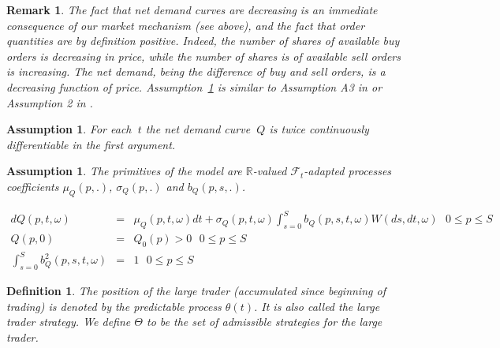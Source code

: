 \documentclass{article}
\newtheorem{definition}[theorem]{Definition}
\newtheorem{remark}[theorem]{Remark}
\newtheorem{assumption}[theorem]{Assumption}
\begin{document}

\begin{remark}
The fact that net demand curves are decreasing is an
immediate consequence of our market mechanism (see above), and the fact that
order quantities are by definition positive. Indeed, the number of shares of
available buy orders is decreasing in price, while the number of shares is
of available sell orders is increasing. The net demand, being the difference
of buy and sell orders, is a decreasing function of price. Assumption~\ref{ass::demand_twice_diff} is
similar to Assumption A3 in \cite{Jar92} or Assumption 2 in \cite{BB04}.
\end{remark}


\begin{assumption} \label{ass::demand_twice_diff}
For each\textbf{\ }$t$ the net demand curve\textbf{\ }$%
Q$ is twice continuously differentiable in the first argument.
\end{assumption}


\begin{assumption}
The primitives of the model are $\mathbb{R}$-valued $%
\mathcal{F}_{t}$-adapted processes coefficients $\mu _{Q}(p,.)$, $\sigma
_{Q}(p,.)$ and $b_{Q}(p,s,.)$.

\begin{eqnarray}
dQ(p,t,\omega ) &=&\mu _{Q}(p,t,\omega )dt+\sigma _{Q}(p,t,\omega
)\int_{s=0}^{S}b_{Q}(p,s,t,\omega )W(ds,dt,\omega )\text{ \ \ \ }0\leq p\leq
S  \label{GenMod1} \\
Q(p,0) &=&Q_{0}(p)>0\text{ \ \ \ \ \ \ \ \ }0\leq p\leq S  \label{GenMod2} \\
\int_{s=0}^{S}b_{Q}^{2}(p,s,t,\omega ) &=&1\text{ \ \ \ \ \ \ \ \ }0\leq
p\leq S  \label{GenMod3}
\end{eqnarray}%
\end{assumption}


\begin{definition}
The position of the large trader (accumulated since
beginning of trading) is denoted by the predictable process $\theta (t)$. It
is also called the \textit{large trader strategy}. We define $\Theta $ to be
the set of admissible strategies for the large trader.
\end{definition}

\end{document}
